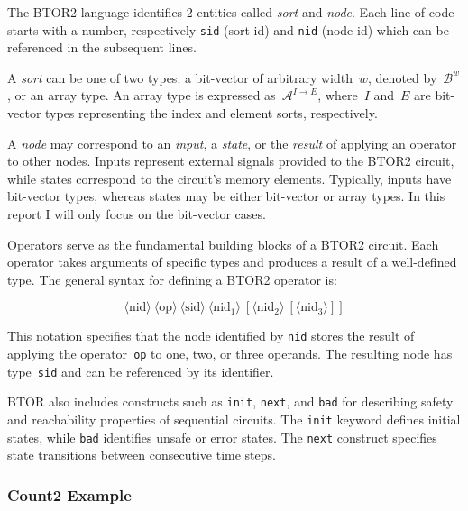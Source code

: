 The BTOR2 language identifies 2 entities called \textit{sort} and \textit{node}. Each line of code starts with a number, respectively \verb|sid| (sort id) and \verb|nid| (node id) which can be referenced in the subsequent lines.  

A \emph{sort} can be one of two types: a bit-vector of arbitrary width~$w$, denoted by~$\mathcal{B}^w$, or an array type. An array type is expressed as~$\mathcal{A}^{I \to E}$, where~$I$ and~$E$ are bit-vector types representing the index and element sorts, respectively.

A \emph{node} may correspond to an \emph{input}, a \emph{state}, or the \emph{result} of applying an operator to other nodes. Inputs represent external signals provided to the BTOR2 circuit, while states correspond to the circuit's memory elements. Typically, inputs have bit-vector types, whereas states may be either bit-vector or array types. In this report I will only focus on the bit-vector cases.

Operators serve as the fundamental building blocks of a BTOR2 circuit. Each operator takes arguments of specific types and produces a result of a well-defined type. The general syntax for defining a BTOR2 operator is:

\[
\langle \text{nid} \rangle\ \langle \text{op} \rangle\ \langle \text{sid} \rangle\ \langle \text{nid}_1 \rangle\ [\langle \text{nid}_2 \rangle\ [\langle \text{nid}_3 \rangle]]
\]

This notation specifies that the node identified by \verb|nid| stores the result of applying the operator~\verb|op| to one, two, or three operands. The resulting node has type~\verb|sid| and can be referenced by its identifier.

{BTOR} also includes constructs such as \texttt{init}, \texttt{next}, and \texttt{bad} for describing safety and reachability properties of sequential circuits. The \texttt{init} keyword defines initial states, while \texttt{bad} identifies unsafe or error states. The \texttt{next} construct specifies state transitions between consecutive time steps.

\subsubsection{Count2 Example}



